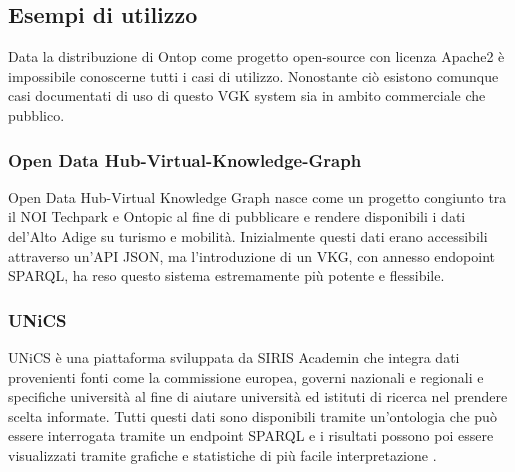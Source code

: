 \subsection{Esempi di utilizzo}
Data la distribuzione di Ontop come progetto open-source con licenza Apache2 è impossibile conoscerne tutti i casi di utilizzo. Nonostante ciò esistono comunque casi documentati di uso di questo VGK system sia in ambito commerciale che pubblico.
\subsubsection*{Open Data Hub-Virtual-Knowledge-Graph}
Open Data Hub-Virtual Knowledge Graph nasce come un progetto congiunto tra il NOI Techpark e Ontopic al fine di pubblicare e rendere disponibili i dati del'Alto Adige su turismo e mobilità. Inizialmente questi dati erano accessibili attraverso un'API JSON, ma l'introduzione di un VKG, con annesso endopoint SPARQL, ha
reso questo sistema estremamente più potente e flessibile.
\subsubsection*{UNiCS}
UNiCS è una piattaforma sviluppata da SIRIS Academin che integra dati provenienti fonti come la commissione europea, governi nazionali e regionali e specifiche università al fine di aiutare università ed istituti di ricerca nel prendere scelta informate. Tutti questi dati sono disponibili tramite un'ontologia che può 
essere interrogata tramite un endpoint SPARQL e i risultati possono poi essere visualizzati tramite grafiche e statistiche di più facile interpretazione \cite{UniCS}.

